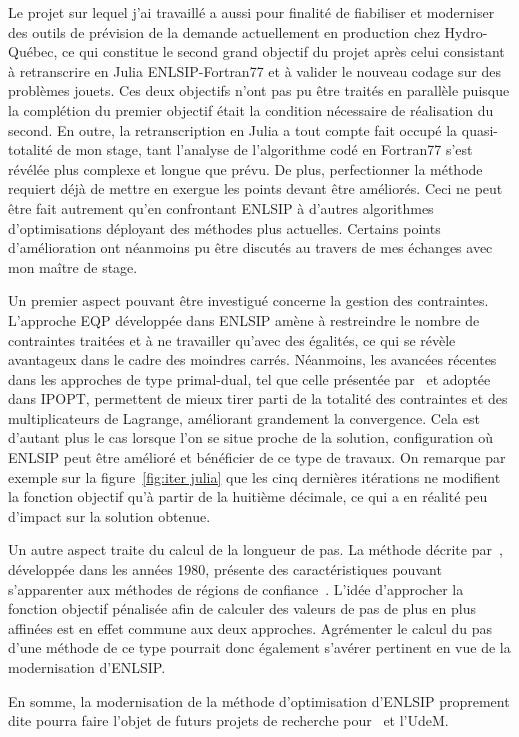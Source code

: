 Le projet sur lequel j'ai travaillé a aussi pour finalité de fiabiliser et moderniser des outils de prévision de la demande actuellement en production chez 
Hydro-Québec, ce qui constitue le second grand objectif du projet après celui consistant à retranscrire en Julia ENLSIP-Fortran77 et à valider le nouveau codage sur des problèmes jouets. 
Ces deux objectifs n'ont pas pu être 
traités en parallèle puisque la complétion du premier objectif était la condition nécessaire de réalisation du second. 
En outre, la retranscription en Julia a tout compte fait occupé la quasi-totalité de mon stage, tant l'analyse de 
l'algorithme codé en Fortran77 s'est révélée plus complexe et longue que prévu. De plus, perfectionner la méthode requiert déjà de mettre en exergue les points
devant être améliorés. Ceci ne peut être fait autrement qu'en confrontant ENLSIP à d'autres algorithmes d'optimisations déployant des méthodes plus actuelles.
Certains points d'amélioration ont néanmoins pu être discutés au travers de mes échanges avec mon maître de stage.

Un premier aspect pouvant être investigué concerne la gestion des contraintes. L'approche EQP développée dans ENLSIP amène à restreindre le nombre de contraintes 
traitées et à ne travailler qu'avec des égalités, ce qui se révèle avantageux dans le cadre des moindres carrés. Néanmoins, les avancées récentes dans les approches de type
primal-dual, tel que celle présentée par~\citet{andreas02} et adoptée dans IPOPT, permettent de mieux tirer parti de la totalité des contraintes et des multiplicateurs de Lagrange, améliorant grandement la convergence.
Cela est d'autant plus le cas lorsque l'on se situe proche de la solution, configuration où ENLSIP peut être amélioré et bénéficier de ce type de travaux. On remarque par exemple sur la 
figure~\ref{fig:iter julia} que les cinq dernières itérations ne modifient la fonction objectif qu'à partir de la huitième décimale, ce qui a en réalité peu d'impact sur la solution obtenue.

Un autre aspect traite du calcul de la longueur de pas. La méthode décrite par~\citet{lindstromwedin1984}, développée dans les années 1980, présente des 
caractéristiques pouvant s'apparenter aux méthodes de régions de confiance~\cite{conngoultoin00}. L'idée d'approcher la fonction objectif pénalisée afin de calculer 
des valeurs de pas de plus en plus affinées est en effet commune aux deux approches. Agrémenter le calcul du pas d'une méthode de ce type pourrait donc également s'avérer pertinent en vue de la 
modernisation d'ENLSIP.

En somme, la modernisation de la méthode d'optimisation d'ENLSIP proprement dite pourra faire l'objet de futurs projets de recherche pour \HQ\ et l'UdeM.
